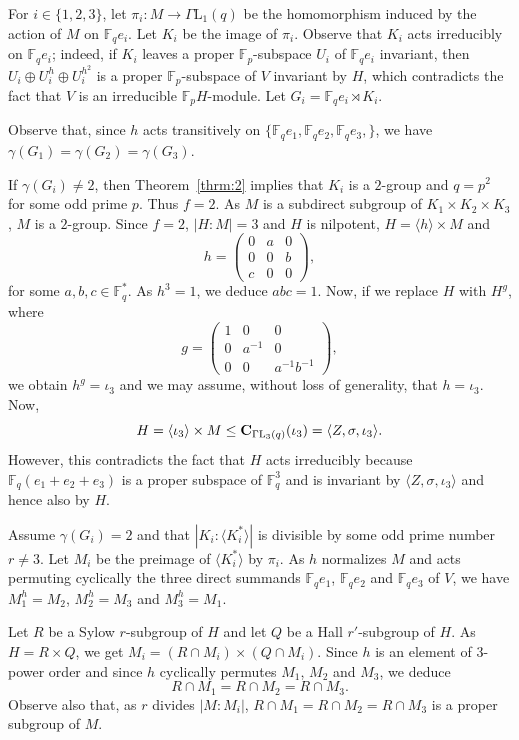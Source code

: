 \documentclass{amsart}
\begin{document}
For $i\in \{1,2,3\}$, let $\pi_i:M\to\Gamma\mathrm{L}_1(q)$ be the homomorphism induced by the action of $M$ on $\mathbb{F}_qe_i$. Let $K_i$ be the image of $\pi_i$. Observe that $K_i$ acts irreducibly on $\mathbb{F}_qe_i$; indeed, if $K_i$ leaves a proper $\mathbb{F}_p$-subspace $U_i$ of $\mathbb{F}_qe_i$ invariant, then $U_i\oplus U_i^h\oplus U_i^{h^2}$ is a proper $\mathbb{F}_p$-subspace of $V$ invariant by $H$, which contradicts the fact that $V$ is an irreducible $\mathbb{F}_pH$-module. Let $G_i=\mathbb{F}_qe_i\rtimes K_i$.

Observe that, since $h$ acts transitively on $\{\mathbb{F}_qe_1,\mathbb{F}_qe_2,\mathbb{F}_qe_3,\}$, we have $\gamma(G_1)=\gamma(G_2)=\gamma(G_3)$.

If $\gamma(G_i)\ne 2$, then Theorem~\ref{thrm:2} implies that $K_i$ is a $2$-group and $q=p^2$ for some odd prime $p$.  Thus $f=2$. As $M$ is a subdirect subgroup of $K_1\times K_2\times K_3$, $M$ is a $2$-group. Since $f=2$, $|H:M|=3$ and $H$ is nilpotent, $H=\langle h\rangle\times M$ and 
$$h=
\begin{pmatrix}
0&a&0\\
0&0&b\\
c&0&0
\end{pmatrix},$$
for some $a,b,c\in\mathbb{F}_q^\ast$. As $h^3=1$, we deduce $abc=1$. Now, if we replace $H$ with $H^g$, where 
$$g=
\begin{pmatrix}
1&0&0\\
0&a^{-1}&0\\
0&0&a^{-1}b^{-1}
\end{pmatrix},$$
we obtain $h^g=\iota_3$ and we may assume, without loss of generality, that $h=\iota_3$. Now, $$H=\langle\iota_3\rangle\times M\le {\bf C}_{\Gamma\mathrm{L}_3(q)}(\iota_3)=\langle Z,\sigma,\iota_3\rangle.$$
However, this contradicts the fact that $H$ acts irreducibly because $\mathbb{F}_q(e_1+e_2+e_3)$ is a proper subspace of $\mathbb{F}_q^3$ and is invariant by 
$\langle Z,\sigma,\iota_3\rangle$ and hence also by $H$.

Assume $\gamma(G_i)= 2$ and that  $|K_i:\langle K_i^\ast\rangle|$ is divisible by some odd prime number $r\ne 3$. 
 Let $M_i$ be the preimage of $\langle K_i^\ast\rangle$ by $\pi_i$. As $h$ normalizes $M$ and acts permuting cyclically the three direct summands $\mathbb{F}_qe_1$, $\mathbb{F}_qe_2$ and $\mathbb{F}_qe_3$ of $V$, we have $M_1^h=M_2$, $M_2^h=M_3$ and $M_3^h=M_1$.
 
Let $R$ be a Sylow $r$-subgroup of $H$ and let $Q$ be a Hall $r'$-subgroup of $H$. As $H=R\times Q$, we get $M_i=(R\cap M_i)\times (Q\cap M_i)$. Since $h$ is an element of $3$-power order and since $h$ cyclically permutes $M_1$, $M_2$ and $M_3$, we deduce
$$R\cap M_1=R\cap M_2=R\cap M_3.$$ 
Observe also that, as $r$ divides $|M:M_i|$, $R\cap M_1=R\cap M_2=R\cap M_3$ is a proper subgroup of $M$.
\end{document}
